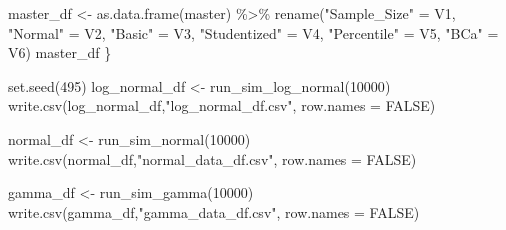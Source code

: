 \documentclass[12pt]{article}
\newenvironment{Shaded}{\begin{snugshade}}{\end{snugshade}}
\newcommand{\AttributeTok}[1]{\textcolor[rgb]{0.77,0.63,0.00}{#1}}
\newcommand{\ConstantTok}[1]{\textcolor[rgb]{0.00,0.00,0.00}{#1}}
\newcommand{\DecValTok}[1]{\textcolor[rgb]{0.00,0.00,0.81}{#1}}
\newcommand{\FunctionTok}[1]{\textcolor[rgb]{0.00,0.00,0.00}{#1}}
\newcommand{\NormalTok}[1]{#1}
\newcommand{\OtherTok}[1]{\textcolor[rgb]{0.56,0.35,0.01}{#1}}
\newcommand{\SpecialCharTok}[1]{\textcolor[rgb]{0.00,0.00,0.00}{#1}}
\newcommand{\StringTok}[1]{\textcolor[rgb]{0.31,0.60,0.02}{#1}}
\begin{document}
\begin{Shaded}
\begin{Highlighting}[]
\NormalTok{  master\_df }\OtherTok{\textless{}{-}} \FunctionTok{as.data.frame}\NormalTok{(master) }\SpecialCharTok{\%\textgreater{}\%} 
      \FunctionTok{rename}\NormalTok{(}\StringTok{"Sample\_Size"} \OtherTok{=}\NormalTok{ V1, }\StringTok{"Normal"} \OtherTok{=}\NormalTok{ V2, }\StringTok{"Basic"} \OtherTok{=}\NormalTok{ V3, }\StringTok{"Studentized"} \OtherTok{=}\NormalTok{ V4, }
             \StringTok{"Percentile"} \OtherTok{=}\NormalTok{ V5, }\StringTok{"BCa"} \OtherTok{=}\NormalTok{ V6) }
\NormalTok{  master\_df}
\NormalTok{\}}
\end{Highlighting}
\end{Shaded}

\begin{Shaded}
\begin{Highlighting}[]
\FunctionTok{set.seed}\NormalTok{(}\DecValTok{495}\NormalTok{)}
\NormalTok{log\_normal\_df }\OtherTok{\textless{}{-}} \FunctionTok{run\_sim\_log\_normal}\NormalTok{(}\DecValTok{10000}\NormalTok{)}
\FunctionTok{write.csv}\NormalTok{(log\_normal\_df,}\StringTok{"log\_normal\_df.csv"}\NormalTok{, }\AttributeTok{row.names =} \ConstantTok{FALSE}\NormalTok{)}

\NormalTok{normal\_df }\OtherTok{\textless{}{-}} \FunctionTok{run\_sim\_normal}\NormalTok{(}\DecValTok{10000}\NormalTok{)}
\FunctionTok{write.csv}\NormalTok{(normal\_df,}\StringTok{"normal\_data\_df.csv"}\NormalTok{, }\AttributeTok{row.names =} \ConstantTok{FALSE}\NormalTok{)}

\NormalTok{gamma\_df }\OtherTok{\textless{}{-}} \FunctionTok{run\_sim\_gamma}\NormalTok{(}\DecValTok{10000}\NormalTok{)}
\FunctionTok{write.csv}\NormalTok{(gamma\_df,}\StringTok{"gamma\_data\_df.csv"}\NormalTok{, }\AttributeTok{row.names =} \ConstantTok{FALSE}\NormalTok{)}
\end{Highlighting}
\end{Shaded}
\end{document}
